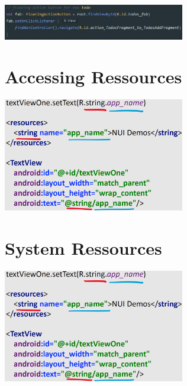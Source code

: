 \documentclass{report}
\newenvironment{Figure}
	{\par\medskip\noindent\minipage{\linewidth}}
	{\endminipage\par\medskip}
\theoremstyle{definition}
\theoremstyle{example}
\begin{document}
\begin{Figure}
   \centering
    \includegraphics[width=300px]{img/onClickListener.png}
        \label{fig:Code Snippet handling events with trigger action}
\end{Figure}

\section{Accessing Ressources}
\begin{Figure}
   \centering
    \includegraphics[width=300px]{img/AccessingRessources.png}
        \label{fig:Code Snippet how to access to ressources}
\end{Figure}

\section{System Ressources}
\begin{Figure}
   \centering
    \includegraphics[width=300px]{img/AccessingRessources.png}
        \label{fig:Code Snippet how to access to ressources}
\end{Figure}
\end{document}
